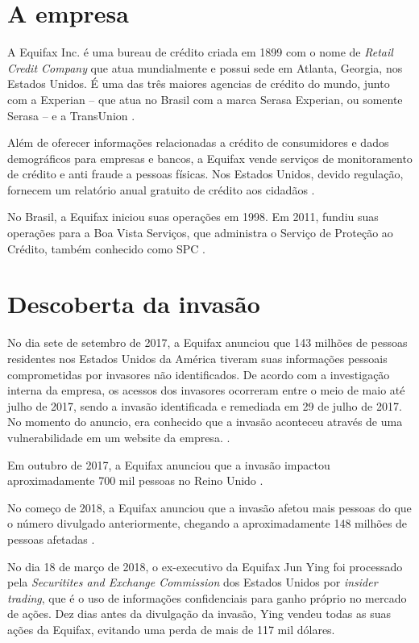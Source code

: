 \documentclass[conference]{IEEEtran}
\begin{document}
\section{A empresa}
A Equifax Inc. é uma bureau de crédito criada em 1899 com o nome de \textit{Retail Credit Company} que atua mundialmente e possui sede em Atlanta, Georgia, nos Estados Unidos. 
É uma das três maiores agencias de crédito do mundo, junto com a Experian -- que atua no Brasil com a marca Serasa Experian,
ou somente Serasa -- e a TransUnion \cite{Roos2008}.

Além de oferecer informações relacionadas a crédito de consumidores e dados demográficos para empresas e bancos, a Equifax
vende serviços de monitoramento de crédito e anti fraude a pessoas físicas. Nos Estados Unidos, devido regulação, fornecem um
relatório anual gratuito de crédito aos cidadãos \cite{Roos2008} \cite{Garkinkel1995}. 

No Brasil, a Equifax iniciou suas operações em 1998. Em 2011, fundiu suas operações para a Boa Vista Serviços, que administra o Serviço de Proteção ao Crédito, também conhecido
como SPC \cite{BoaVista2018} \cite{Sandrini2011}. 

\section{Descoberta da invasão} 
No dia sete de setembro de 2017, a Equifax anunciou que 143 milhões de pessoas residentes nos Estados Unidos da América tiveram suas informações pessoais comprometidas por invasores 
não identificados. De acordo com a investigação interna da empresa, os acessos dos invasores ocorreram entre o meio de maio até julho de 2017, sendo a invasão identificada e remediada 
em 29 de julho de 2017. No momento do anuncio, era conhecido que a invasão aconteceu através de uma vulnerabilidade em um website da empresa. \cite{Carman2017} \cite{Equifax2017} \cite{Bernard2017} \cite{Moore2017}.

Em outubro de 2017, a Equifax anunciou que a invasão impactou aproximadamente 700 mil pessoas no Reino Unido \cite{Pritchard2017}. 

No começo de 2018, a Equifax anunciou que a invasão afetou mais pessoas do que o número divulgado anteriormente, chegando a aproximadamente 148 milhões de pessoas afetadas \cite{Whittaker2018} \cite{Borak2018} \cite{Clements2018}.

No dia 18 de março de 2018, o ex-executivo da Equifax Jun Ying foi processado pela \textit{Securitites and Exchange Commission} dos Estados Unidos por \textit{insider trading}, que é o uso de informações confidenciais
para ganho próprio no mercado de ações. Dez dias antes da divulgação da invasão, Ying vendeu todas as suas ações da Equifax, evitando uma perda de mais de 117 mil dólares. 
\end{document}
